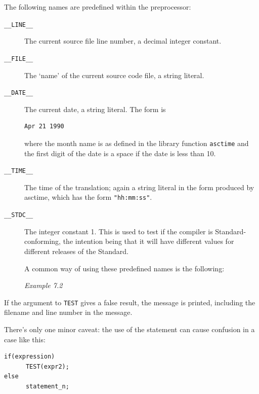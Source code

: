    The following names are predefined within the preprocessor:


   \begin{description}
    \item[\texttt{\_\_LINE\_\_}] The current source file line number, a decimal integer constant.

    \item[\texttt{\_\_FILE\_\_}] The `name' of the current source code file, a string
     literal.

    \item[\texttt{\_\_DATE\_\_}] 
     The current date, a string literal. The form is

     \begin{Verbatim}
Apr 21 1990
\end{Verbatim}

     where the month name is as defined in the library function
      \texttt{asctime} and the first digit of the date is a space if
      the date is less than 10.

    

    \item[\texttt{\_\_TIME\_\_}] The time of the translation; again a string literal in the form
     produced by asctime, which has the form \texttt{"hh:mm:ss"}.

    \item[\texttt{\_\_STDC\_\_}] 
     The integer constant 1. This is used to test if the compiler is
      Standard-conforming, the intention being that it will have different
      values for different releases of the Standard.

     A common way of using these predefined names is the following:


     \begin{center}\textit{Example 7.2}\end{center}


    
   \end{description}

   If the argument to \texttt{TEST} gives a false result, the message
    is printed, including the filename and line number in the message.


   There's only one minor caveat: the use of the \kif{}
    statement can cause confusion in a case like this:


   \begin{Verbatim}
if(expression)
      TEST(expr2);
else
      statement_n;
\end{Verbatim}

